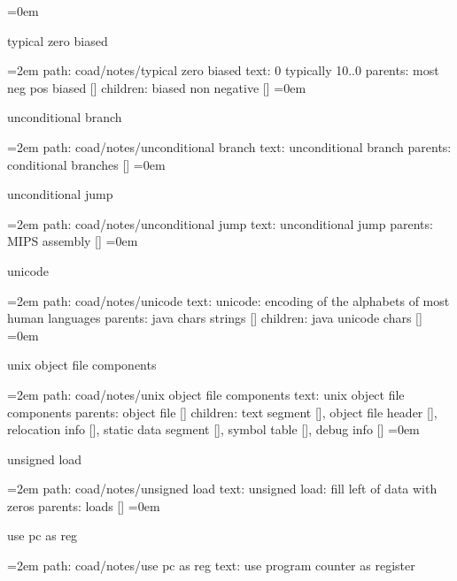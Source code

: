\smallskip
\leftskip=0em
\par\endgroup
\bigskip
{}
typical zero biased
\smallskip
\par\begingroup
\leftskip=2em
path: coad/notes/typical zero biased
\smallskip
text:  0 typically 10..0
\smallskip
parents:  most neg pos biased []
\smallskip
children: biased non negative []
\smallskip
\leftskip=0em
\par\endgroup
\bigskip
{}
unconditional branch
\smallskip
\par\begingroup
\leftskip=2em
path: coad/notes/unconditional branch
\smallskip
text:  unconditional branch
\smallskip
parents:  conditional branches []
\smallskip
\leftskip=0em
\par\endgroup
\bigskip
{}
unconditional jump
\smallskip
\par\begingroup
\leftskip=2em
path: coad/notes/unconditional jump
\smallskip
text:  unconditional jump
\smallskip
parents:  MIPS assembly []
\smallskip
\leftskip=0em
\par\endgroup
\bigskip
{}
unicode
\smallskip
\par\begingroup
\leftskip=2em
path: coad/notes/unicode
\smallskip
text:  unicode: encoding of the alphabets of most human languages
\smallskip
parents:  java chars strings []
\smallskip
children: java unicode chars []
\smallskip
\leftskip=0em
\par\endgroup
\bigskip
{}
unix object file components
\smallskip
\par\begingroup
\leftskip=2em
path: coad/notes/unix object file components
\smallskip
text:  unix object file components
\smallskip
parents:  object file []
\smallskip
children: text segment [], object file header [], relocation info [], static data segment [], symbol table [], debug info []
\smallskip
\leftskip=0em
\par\endgroup
\bigskip
{}
unsigned load
\smallskip
\par\begingroup
\leftskip=2em
path: coad/notes/unsigned load
\smallskip
text:  unsigned load: fill left of data with zeros
\smallskip
parents:  loads []
\smallskip
\leftskip=0em
\par\endgroup
\bigskip
{}
use pc as reg
\smallskip
\par\begingroup
\leftskip=2em
path: coad/notes/use pc as reg
\smallskip
text:  use program counter as register
\smallskip
